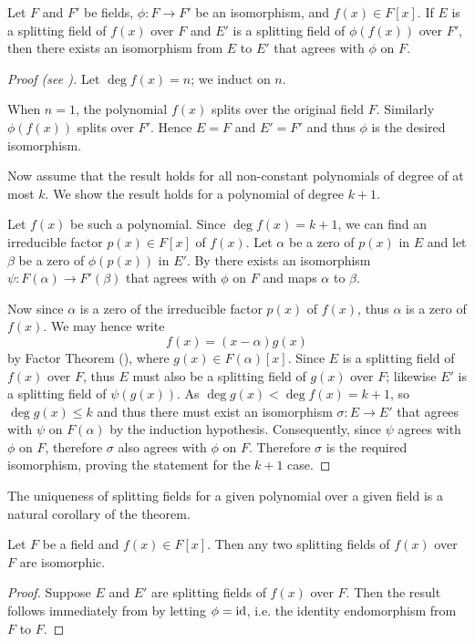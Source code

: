 \begin{theorem}\label{thrm-isomorphism-extension}
    Let $F$ and $F'$ be fields, $\phi: F \to F'$ be an isomorphism, and $f(x) \in F[x]$. If $E$ is a splitting field of $f(x)$ over $F$ and $E'$ is a splitting field of $\phi(f(x))$ over $F'$, then there exists an isomorphism from $E$ to $E'$ that agrees with $\phi$ on $F$.
\end{theorem}
\begin{proof}[Proof (see {\cite[Theorem 20.4]{gallian_2016}})]
    Let $\deg f(x) = n$; we induct on $n$.

    When $n = 1$, the polynomial $f(x)$ splits over the original field $F$. Similarly $\phi(f(x))$ splits over $F'$. Hence $E = F$ and $E' = F'$ and thus $\phi$ is the desired isomorphism.

    Now assume that the result holds for all non-constant polynomials of degree of at most $k$. We show the result holds for a polynomial of degree $k + 1$.

    Let $f(x)$ be such a polynomial. Since $\deg f(x) = k+1$, we can find an irreducible factor $p(x) \in F[x]$ of $f(x)$. Let $\alpha$ be a zero of $p(x)$ in $E$ and let $\beta$ be a zero of $\phi(p(x))$ in $E'$. By  there exists an isomorphism $\psi: F(\alpha) \to F'(\beta)$ that agrees with $\phi$ on $F$ and maps $\alpha$ to $\beta$.

    Now since $\alpha$ is a zero of the irreducible factor $p(x)$ of $f(x)$, thus $\alpha$ is a zero of $f(x)$. We may hence write
    \[
        f(x) = (x-\alpha)g(x)
    \]
    by Factor Theorem (), where $g(x) \in F(\alpha)[x]$. Since $E$ is a splitting field of $f(x)$ over $F$, thus $E$ must also be a splitting field of $g(x)$ over $F$; likewise $E'$ is a splitting field of $\psi(g(x))$. As $\deg g(x) < \deg f(x) = k+1$, so $\deg g(x) \leq k$ and thus there must exist an isomorphism $\sigma: E \to E'$ that agrees with $\psi$ on $F(\alpha)$ by the induction hypothesis. Consequently, since $\psi$ agrees with $\phi$ on $F$, therefore $\sigma$ also agrees with $\phi$ on $F$. Therefore $\sigma$ is the required isomorphism, proving the statement for the $k+1$ case.
\end{proof}

The uniqueness of splitting fields for a given polynomial over a given field is a natural corollary of the theorem.

\begin{corollary}\label{corollary-splitting-field-unique-up-to-isomorphism}
    Let $F$ be a field and $f(x) \in F[x]$. Then any two splitting fields of $f(x)$ over $F$ are isomorphic.
\end{corollary}
\begin{proof}
    Suppose $E$ and $E'$ are splitting fields of $f(x)$ over $F$. Then the result follows immediately from  by letting $\phi = \mathrm{id}$, i.e. the identity endomorphism from $F$ to $F$.
\end{proof}

